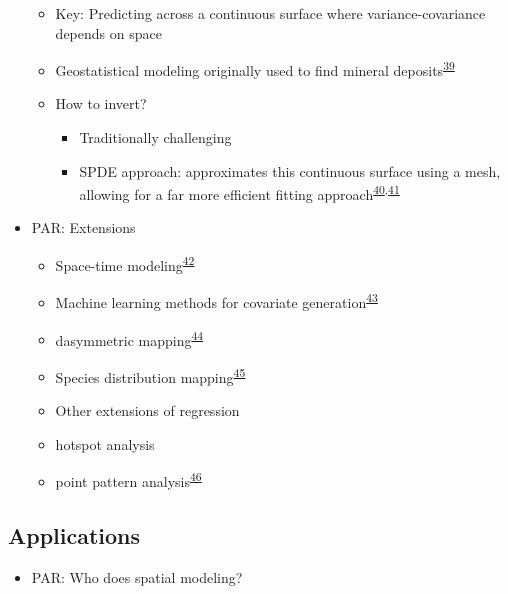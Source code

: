 \documentclass[
]{article}
\providecommand{\tightlist}{%
  \setlength{\itemsep}{0pt}\setlength{\parskip}{0pt}}
\begin{document}
\begin{itemize}
  \begin{itemize}
  \tightlist
  \item
    Key: Predicting across a continuous surface where variance-covariance depends on space
  \item
    Geostatistical modeling originally used to find mineral deposits\textsuperscript{\protect\hyperlink{ref-Oliver2010}{39}}
  \item
    How to invert?

    \begin{itemize}
    \tightlist
    \item
      Traditionally challenging
    \item
      SPDE approach: approximates this continuous surface using a mesh, allowing for
      a far more efficient fitting approach\textsuperscript{\protect\hyperlink{ref-Lindgren2011}{40},\protect\hyperlink{ref-Miller2020}{41}}
    \end{itemize}
  \end{itemize}
\item
  PAR: Extensions

  \begin{itemize}
  \tightlist
  \item
    Space-time modeling\textsuperscript{\protect\hyperlink{ref-Mercer2015}{42}}
  \item
    Machine learning methods for covariate generation\textsuperscript{\protect\hyperlink{ref-Bhatt2017}{43}}
  \item
    dasymmetric mapping\textsuperscript{\protect\hyperlink{ref-Tatem2017}{44}}
  \item
    Species distribution mapping\textsuperscript{\protect\hyperlink{ref-Hay2013}{45}}
  \item
    Other extensions of regression
  \item
    hotspot analysis
  \item
    point pattern analysis\textsuperscript{\protect\hyperlink{ref-Banerjee2014}{46}}
  \end{itemize}
\end{itemize}

\hypertarget{applications}{%
\subsection{Applications}\label{applications}}

\begin{itemize}
\tightlist
\item
  PAR: Who does spatial modeling?
\end{itemize}
\end{document}
